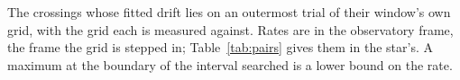 \begin{table}
\caption{The crossings whose fitted drift lies on an outermost trial of
their window's own grid, with the grid each is measured against. Rates are in
the observatory frame, the frame the grid is stepped in;
Table~\ref{tab:pairs} gives them in the star's. A maximum
at the boundary of the interval searched is a lower bound on the rate.}
\label{tab:edge}
\footnotesize

\end{table}
